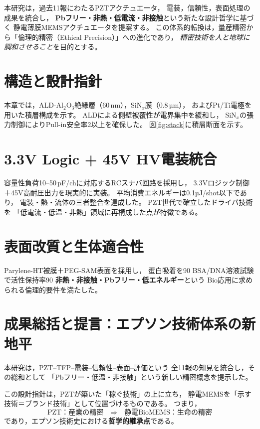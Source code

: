 \documentclass[conference]{IEEEtran}
\begin{document}
本研究は，過去11報にわたるPZTアクチュエータ，
電装，信頼性，表面処理の成果を統合し，
\textbf{Pbフリー・非熱・低電流・非接触}という新たな設計哲学に基づく
静電薄膜MEMSアクチュエータを提案する。
この体系的転換は，量産精密から「倫理的精密（Ethical Precision）」への進化であり，
\emph{精密技術を人と地球に調和させること}を目的とする。

\section{構造と設計指針}
本章では，ALD-Al$_2$O$_3$絶縁層（60\,nm），SiN$_x$膜（0.8\,µm），
およびPt/Ti電極を用いた積層構成を示す。
ALDによる側壁被覆性が電界集中を緩和し，
SiN$_x$の張力制御によりPull-in安全率2以上を確保した。
図\ref{fig:stack}に積層断面を示す。


\section{3.3V Logic + 45V HV電装統合}
容量性負荷10–50\,pF/chに対応するRCスナバ回路を採用し，
3.3Vロジック制御＋45V高耐圧出力を現実的に実装。
平均消費エネルギーは0.1µJ/shot以下であり，
電装・熱・流体の三者整合を達成した。
PZT世代で確立したドライバ技術を
「低電流・低温・非熱」領域に再構成した点が特徴である。

\section{表面改質と生体適合性}
Parylene-HT被膜＋PEG-SAM表面を採用し，
蛋白吸着を90%
BSA/DNA溶液試験で活性保持率90%
\textbf{非熱・非接触・Pbフリー・低エネルギー}という
Bio応用に求められる倫理的要件を満たした。

\section{成果総括と提言：エプソン技術体系の新地平}
本研究は，PZT–TFP–電装–信頼性–表面–評価という
全11報の知見を統合し，その総和として
「Pbフリー・低温・非接触」という新しい精密概念を提示した。

この設計指針は，PZTが築いた「稼ぐ技術」の上に立ち，
静電MEMSを「示す技術＝ブランド技術」として位置づけるものである。
つまり，
\[
\text{PZT：産業の精密} \quad\Rightarrow\quad
\text{静電BioMEMS：生命の精密}
\]
であり，エプソン技術史における\textbf{哲学的継承点}である。
\end{document}
